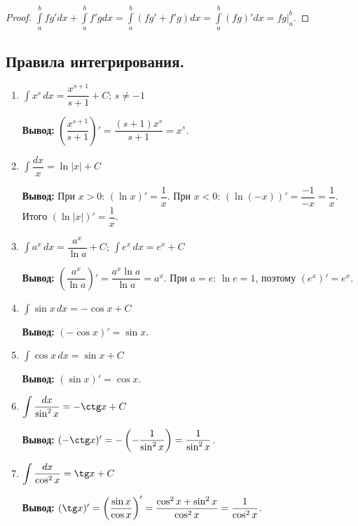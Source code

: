 \documentclass[12pt]{article}
\newcommand{\dint}{\displaystyle\int}
\begin{document}
	\begin{proof}
		$\dint\limits_a^b f g' dx + \dint\limits_a^b f' g dx = \dint\limits_a^b (f g' + f' g) dx = \dint\limits_a^b (fg)' dx = fg \Bigr|_a^b$.
	\end{proof}
	
	\subsection{Правила интегрирования.}
	
    \begin{enumerate}
        \item $\dint x^s\,dx = \dfrac{x^{s+1}}{s+1} + C$; $s \ne -1$
        
        \textbf{Вывод:} $\left(\dfrac{x^{s+1}}{s+1}\right)' = \dfrac{(s+1)x^s}{s+1} = x^s$. \checkmark
        
        \item $\dint \dfrac{dx}{x} = \ln|x| + C$
        
        \textbf{Вывод:} При $x > 0$: $(\ln x)' = \dfrac{1}{x}$. При $x < 0$: $(\ln(-x))' = \dfrac{-1}{-x} = \dfrac{1}{x}$. Итого $(\ln|x|)' = \dfrac{1}{x}$. \checkmark
        
        \item $\dint a^x\,dx = \dfrac{a^x}{\ln a} + C$; $\dint e^x\,dx = e^x + C$
        
        \textbf{Вывод:} $\left(\dfrac{a^x}{\ln a}\right)' = \dfrac{a^x \ln a}{\ln a} = a^x$. При $a = e$: $\ln e = 1$, поэтому $(e^x)' = e^x$. \checkmark
        
        \item $\dint \sin x\,dx = -\cos x + C$
        
        \textbf{Вывод:} $(-\cos x)' = \sin x$. \checkmark
        
        \item $\dint \cos x\,dx = \sin x + C$
        
        \textbf{Вывод:} $(\sin x)' = \cos x$. \checkmark
        
        \item $\dint \dfrac{dx}{\sin^2 x} = -\ctg x + C$
        
        \textbf{Вывод:} $(-\ctg x)' = -\left(-\dfrac{1}{\sin^2 x}\right) = \dfrac{1}{\sin^2 x}$. \checkmark
        
        \item $\dint \dfrac{dx}{\cos^2 x} = \tg x + C$
        
        \textbf{Вывод:} $(\tg x)' = \left(\dfrac{\sin x}{\cos x}\right)' = \dfrac{\cos^2 x + \sin^2 x}{\cos^2 x} = \dfrac{1}{\cos^2 x}$. \checkmark
        

\end{enumerate}
\end{document}
